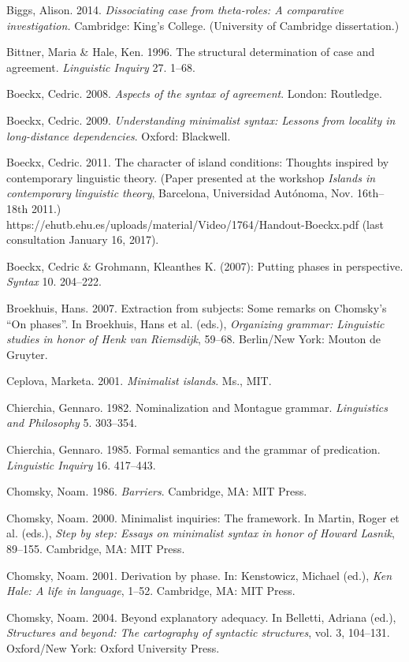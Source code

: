 \documentclass[output=paper]{langsci/langscibook}
\begin{document}
Biggs, Alison. 2014. \textit{Dissociating case from theta-roles: A comparative investigation.} Cambridge: King’s College. (University of Cambridge dissertation.)

Bittner, Maria \& Hale, Ken. 1996. The structural determination of case and agreement. \textit{Linguistic Inquiry} 27. 1–68.

Boeckx, Cedric. 2008. \textit{Aspects of the syntax of agreement}. London: Routledge.

Boeckx, Cedric. 2009. \textit{Understanding minimalist syntax: Lessons from locality in long-distance dependencies}. Oxford: Blackwell.

Boeckx, Cedric. 2011. The character of island conditions: Thoughts inspired by contemporary linguistic theory. (Paper presented at the workshop \textit{Islands in contemporary linguistic theory}, Barcelona, Universidad Autónoma, Nov. 16th–18th 2011.)\\
https://ehutb.ehu.es/uploads/material/Video/1764/Handout-Boeckx.pdf (last consultation January 16, 2017).

Boeckx, Cedric \& Grohmann, Kleanthes K. (2007): Putting phases in perspective. \textit{Syntax} 10. 204–222.

Broekhuis, Hans. 2007. Extraction from subjects: Some remarks on Chomsky’s “On phases”. In Broekhuis, Hans et al. (eds.), \textit{Organizing grammar: Linguistic studies in honor of Henk van Riemsdijk}, 59–68. Berlin/New York: Mouton de Gruyter.

Ceplova, Marketa. 2001. \textit{Minimalist islands}. Ms., MIT.

Chierchia, Gennaro. 1982. Nominalization and Montague grammar. \textit{Linguistics and Philosophy} 5. 303–354.

Chierchia, Gennaro. 1985. Formal semantics and the grammar of predication. \textit{Linguistic Inquiry} 16. 417–443.

Chomsky, Noam. 1986. \textit{Barriers}. Cambridge, MA: MIT Press.

Chomsky, Noam. 2000. Minimalist inquiries: The framework. In Martin, Roger et al. (eds.), \textit{Step by step: Essays on minimalist syntax in honor of Howard Lasnik}, 89–155. Cambridge, MA: MIT Press.

Chomsky, Noam. 2001. Derivation by phase. In: Kenstowicz, Michael (ed.), \textit{Ken Hale: A life in language}, 1–52. Cambridge, MA: MIT Press.

Chomsky, Noam. 2004. Beyond explanatory adequacy. In Belletti, Adriana (ed.), \textit{Structures and beyond: The cartography of syntactic structures}, vol. 3, 104–131. Oxford/New York: Oxford University Press.
\end{document}
